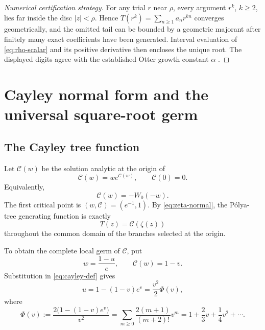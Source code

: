 \documentclass[11pt,oneside]{article}
\numberwithin{equation}{section}
\theoremstyle{plain}
\theoremstyle{definition}
\theoremstyle{remark}
\newcommand{\Cay}{\mathcal C}
\begin{document}
\begin{proof}[Numerical certification strategy]
For any trial $r$ near $\rho$, every argument $r^k$, $k\ge2$, lies far
inside the disc $|z|<\rho$.  Hence
$T(r^k)=\sum_{n\ge1}a_nr^{kn}$ converges geometrically, and the omitted tail
can be bounded by a geometric majorant after finitely many exact
coefficients have been generated.  Interval evaluation of
\eqref{eq:rho-scalar} and its positive derivative then encloses the unique
root.  The displayed digits agree with the established Otter growth
constant $\alpha$ \cite{OEISOtterConstants}.
\end{proof}

\section{Cayley normal form and the universal square-root germ}\label{sec:cayley}

\subsection{The Cayley tree function}

Let $\Cay(w)$ be the solution analytic at the origin of
\begin{equation}\label{eq:cayley-def}
 \Cay(w)=w e^{\Cay(w)},\qquad \Cay(0)=0.
\end{equation}
Equivalently,
\begin{equation}\label{eq:cayley-lambert}
 \Cay(w)=-W_0(-w).
\end{equation}
The first critical point is $(w,\Cay)=(e^{-1},1)$.  By
\eqref{eq:zeta-normal}, the P\'olya-tree generating function is exactly
\begin{equation}\label{eq:T-C-zeta}
 T(z)=\Cay(\zeta(z))
\end{equation}
throughout the common domain of the branches selected at the origin.

To obtain the complete local germ of $\Cay$, put
\begin{equation}\label{eq:cayley-local-variables}
 w=\frac{1-u}{e},\qquad \Cay(w)=1-v.
\end{equation}
Substitution in \eqref{eq:cayley-def} gives
\begin{equation}\label{eq:u-v-relation}
 u=1-(1-v)e^v=\frac{v^2}{2}\Phi(v),
\end{equation}
where
\begin{equation}\label{eq:Phi-def}
 \Phi(v):=\frac{2\bigl(1-(1-v)e^v\bigr)}{v^2}
 =\sum_{m\ge0}\frac{2(m+1)}{(m+2)!}v^m
 =1+\frac23v+\frac14v^2+\cdots.
\end{equation}
\end{document}
